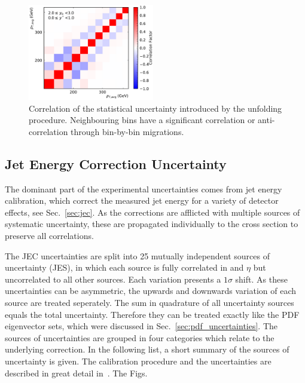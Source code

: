 \begin{figure}[htbp]
    \includegraphics[width=0.49\textwidth]{figures/measurement/unf_nlo_corr_yb2ys0.pdf}
    \caption[Correlations of statistical uncertainty]{Correlation of the
        statistical uncertainty introduced by the unfolding procedure.
        Neighbouring bins have a significant correlation or anti-correlation
        through bin-by-bin migrations.}
    \label{fig:corr_unfolding_nlo}
\end{figure}

\subsection{Jet Energy Correction Uncertainty}

The dominant part of the experimental uncertainties comes from jet energy
calibration, which correct the measured jet energy for a variety of detector
effects, see Sec.~\ref{sec:jec}. As the corrections are afflicted with multiple
sources of systematic uncertainty, these are propagated individually to the cross section
to preserve all correlations.

The JEC uncertainties are split into 25 mutually independent sources of
uncertainty (JES), in which each source is fully correlated in \pt and $\eta$
but uncorrelated to all other sources. Each variation presents a $1\sigma$
shift. As these uncertainties can be asymmetric, the upwards and downwards
variation of each source are treated seperately. The sum in quadrature of all uncertainty
sources equals the total uncertainty. Therefore they can be treated exactly like
the PDF eigenvector sets, which were discussed in
Sec.~\ref{sec:pdf_uncertainties}. The sources of uncertainties are grouped in
four categories which relate to the underlying correction. In the following
list, a short summary of the sources of uncertainty is given. The calibration
procedure and the uncertainties are described in great detail
in~\cite{jec_paper}. The Figs.

